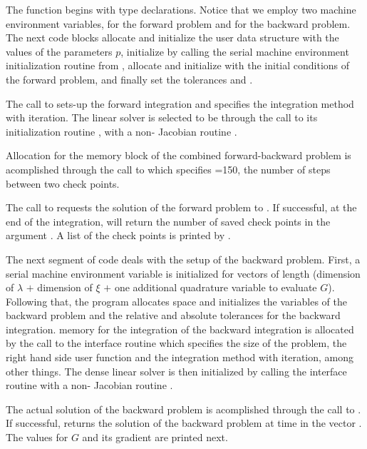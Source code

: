 The  function begins with type declarations. Notice that we employ two machine 
environment variables,  for the forward problem and  for
the backward problem. The next code blocks allocate and initialize the user data
structure with the values of the parameters $p$, initialize  by calling
the serial machine environment initialization routine from {\nvecs}, allocate and
initialize  with the initial conditions of the forward problem, and finally
set the tolerances  and .

The call to  sets-up the forward integration and specifies the
 integration method with  iteration. The linear solver is
selected to be {\cvdense} through the call to its initialization routine
, with a non- Jacobian routine .

Allocation for the memory block of the combined forward-backward problem is
acomplished through the call to  which specifies =150,
the number of steps between two check points.

The call to  requests the solution of the forward problem to .
If successful, at the end of the integration,  will return the number
of saved check points in the argument . A list of the check points
is printed by .

The next segment of code deals with the setup of the backward problem. First,
a serial machine environment variable  is initialized for vectors
of length  (dimension of $\lambda$ $+$ dimension of $\xi$ $+$
one additional quadrature variable to evaluate $G$). Following that, the program 
allocates space and initializes the variables of the backward problem and
the relative and absolute tolerances for the backward integration.
{\cvodes} memory for the integration of the backward integration is allocated
by the call to the interface routine  which specifies the
size of the problem, the right hand side user function  and the 
integration method with  iteration, among other things.
The dense linear solver {\cvdense} is then initialized by calling the 
interface routine with a non- Jacobian routine .

The actual solution of the backward problem is acomplished through the call to
. If successful,  returns the solution of the backward 
problem at time  in the vector . The values for $G$ and its gradient
are printed next.

